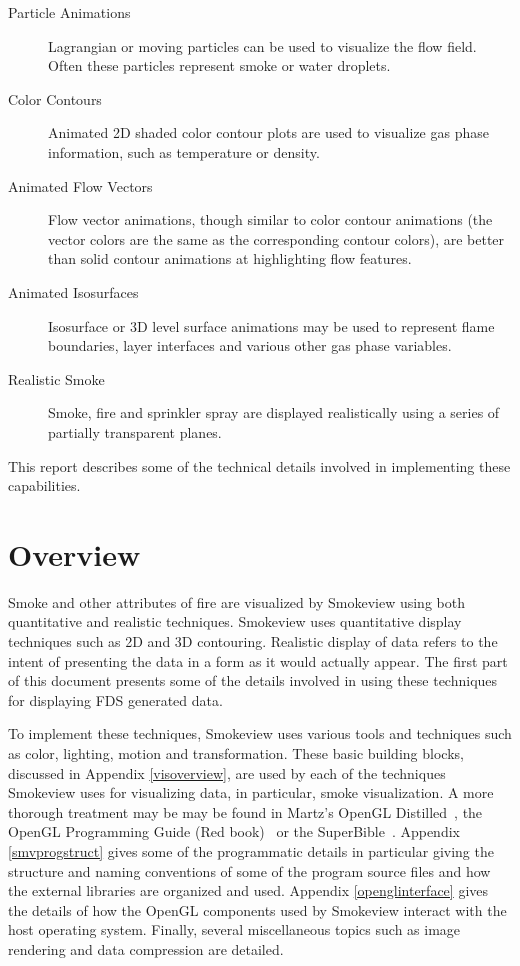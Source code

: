 \documentclass[11pt,twoside]{book}
\begin{document}
\begin{description}
\item[Particle Animations] Lagrangian or moving particles can be
used to visualize the flow field. Often these particles represent
smoke or water droplets.

\item[Color Contours] Animated 2D shaded color contour plots are
used to visualize gas phase information, such as temperature or
density.

\item[Animated Flow Vectors] Flow vector animations, though
similar to color contour animations (the vector colors are the
same as the corresponding contour colors), are better than solid
contour animations at highlighting flow features.

\item[Animated Isosurfaces] Isosurface or 3D level surface
animations may be used to represent flame boundaries, layer
interfaces and various other gas phase variables.

\item[Realistic Smoke] Smoke, fire and sprinkler spray are
displayed realistically using a series of partially transparent
planes.

\end{description}

This report describes some of the technical details involved in implementing these capabilities.

%
%

\section{Overview}

Smoke and other attributes of fire are visualized by Smokeview
using both quantitative and realistic techniques.  Smokeview uses
quantitative display techniques such as 2D and 3D contouring.
Realistic display of data refers to the intent of presenting the
data in a form as it would actually appear. The first part of this
document presents some of the details involved in using these
techniques for displaying FDS generated data.

To implement these techniques, Smokeview uses various tools and
techniques such as color, lighting, motion and transformation.
These basic building blocks, discussed in Appendix
\ref{visoverview}, are used by each of the techniques Smokeview
uses for visualizing data, in particular, smoke visualization. A
more thorough treatment may be may be found in Martz's OpenGL
Distilled~\cite{martz:06}, the OpenGL Programming Guide (Red
book)~\cite{OpenGLRed} or the SuperBible~\cite{SUPERBIBLE}.
Appendix \ref{smvprogstruct} gives some of the programmatic
details in particular giving the structure and naming conventions
of some of the program source files and how the external libraries
are organized and used.  Appendix \ref{openglinterface} gives the
details of how the OpenGL components used by Smokeview interact
with the host operating system.  Finally, several miscellaneous
topics such as image rendering and data compression are detailed.
\end{document}
